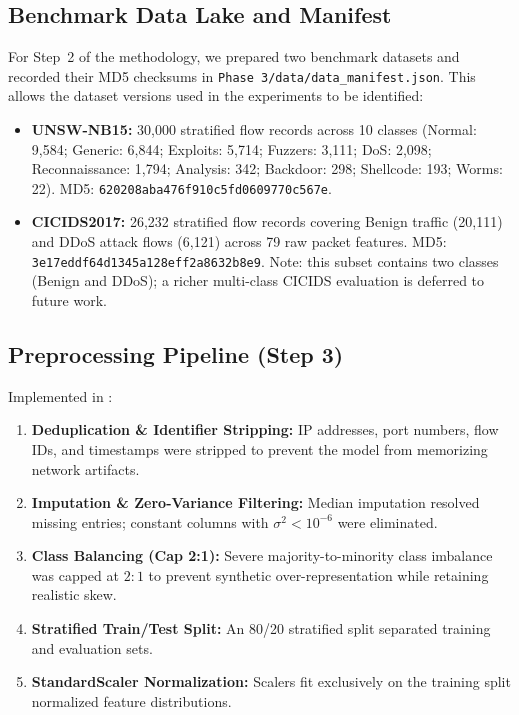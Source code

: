 \documentclass[11pt,a4paper]{article}
\begin{document}
\subsection{Benchmark Data Lake and Manifest}
For Step~2 of the methodology, we prepared two benchmark datasets and recorded their MD5 checksums in \texttt{Phase 3/data/data\_manifest.json}. This allows the dataset versions used in the experiments to be identified:
\begin{itemize}[leftmargin=1.6em,itemsep=1pt]
    \item \textbf{UNSW-NB15:} 30,000 stratified flow records across 10 classes (Normal: 9,584; Generic: 6,844; Exploits: 5,714; Fuzzers: 3,111; DoS: 2,098; Reconnaissance: 1,794; Analysis: 342; Backdoor: 298; Shellcode: 193; Worms: 22). MD5: \texttt{620208aba476f910c5fd0609770c567e}.
    \item \textbf{CICIDS2017:} 26,232 stratified flow records covering Benign traffic (20,111) and DDoS attack flows (6,121) across 79 raw packet features. MD5: \texttt{3e17eddf64d1345a128eff2a8632b8e9}. Note: this subset contains two classes (Benign and DDoS); a richer multi-class CICIDS evaluation is deferred to future work.
\end{itemize}

\subsection{Preprocessing Pipeline (Step 3)}
Implemented in :
\begin{enumerate}[leftmargin=1.8em,itemsep=1pt]
    \item \textbf{Deduplication \& Identifier Stripping:} IP addresses, port numbers, flow IDs, and timestamps were stripped to prevent the model from memorizing network artifacts.
    \item \textbf{Imputation \& Zero-Variance Filtering:} Median imputation resolved missing entries; constant columns with $\sigma^2 < 10^{-6}$ were eliminated.
    \item \textbf{Class Balancing (Cap 2:1):} Severe majority-to-minority class imbalance was capped at $2:1$ to prevent synthetic over-representation while retaining realistic skew.
    \item \textbf{Stratified Train/Test Split:} An 80/20 stratified split separated training and evaluation sets.
    \item \textbf{StandardScaler Normalization:} Scalers fit exclusively on the training split normalized feature distributions.
\end{enumerate}
\end{document}
